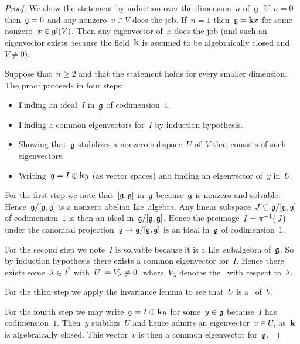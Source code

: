 \begin{proof}
  We show the statement by induction over the dimension~$n$ of~$\glie$.
  If~$n = 0$ then~$\mathfrak{g} = 0$ and any nonzero~$v \in V$ does the job.
  If~$n = 1$ then~$\mathfrak{g} = \mathbf{k} x$ for some nonzero~$x \in \mathfrak{gl}(V)$.
  Then any eigenvector of~$x$ does the job (and such an eigenvector exists because the field~$\mathbf{k}$ is assumed to be algebraically closed and~$V \neq 0$).
 
  Suppose that~$n \geq 2$ and that the statement holds for every smaller dimension.
  The proof proceeds in four steps:
  \begin{itemize}
    \item
      Finding an ideal~$I$ in~$\glie$ of codimension~$1$.
    \item
      Finding a common eigenvectors for~$I$ by induction hypothesis.
    \item
      Showing that~$\glie$ stabilizes a nonzero subspace~$U$ of~$V$ that consists of such eigenvectors.
    \item
      Writing~$\mathfrak{g} = I \oplus \mathbf{k} y$ (as vector spaces) and finding an eigenvector of~$y$ in~$U$.
  \end{itemize}

  For the first step we note that~$[\mathfrak{g},\mathfrak{g}]$ in~$\glie$ because~$\glie$ is nonzero and solvable.
  Hence~$\mathfrak{g}/[\mathfrak{g},\mathfrak{g}]$ is a nonzero abelian Lie~algebra.
  Any linear subspace~$J \subseteq \mathfrak{g}/[\mathfrak{g},\mathfrak{g}]$ of codimension~$1$ is then an ideal in~$\mathfrak{g}/[\mathfrak{g},\mathfrak{g}]$.
  Hence the preimage~$I = \pi^{-1}(\, J)$ under the canonical projection~$\mathfrak{g} \to \mathfrak{g}/[\mathfrak{g},\mathfrak{g}]$ is an ideal in~$\glie$ of codimension~$1$.
 
  For the second step we note~$I$ is solvable because it is a Lie~subalgebra of~$\glie$.
  So by induction hypothesis there exists a common eigenvector for~$I$.
  Hence there exists some~$\lambda \in I^*$ with~$U \coloneqq V_\lambda \neq 0$, where~$V_\lambda$ denotes the~{} with respect to~$\lambda$.
  
  For the third step we apply the invariance lemma to see that~$U$ is a~{\subrepresentation{$\glie$}} of~$V$.
 
  For the fourth step we may write~$\mathfrak{g} = I \oplus \mathbf{k} y$ for some~$y \in \mathfrak{g}$ because~$I$ has codimension~$1$.
  Then~$y$ stabilizs~$U$ and hence admits an eigenvector~$v \in U$, as~$\mathbf{k}$ is algebraically closed.
  This vector~$v$ is then a common eigenvector for~$\glie$.
\end{proof}


